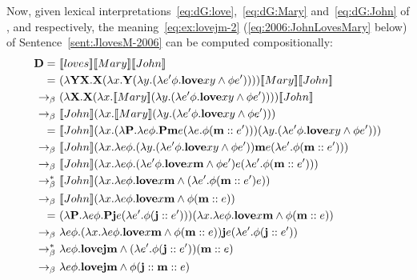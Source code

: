 \begin{example} Now, given lexical interpretations~\eqref{eq:dG:love},~\eqref{eq:dG:Mary} and~\eqref{eq:dG:John} of ,  and  respectively, the meaning~\eqref{eq:ex:lovejm-2} (\eqref{eq:2006:JohnLovesMary} below) of Sentence~\eqref{sent:JlovesM-2006}  can be computed compositionally:
\begin{align}
\D = \ & \I{loves} \I{Mary} \I{John}  \notag \\
= \ & (\lambda \Y2 \X2. \X2( \lambda \x1. \Y2 (\lambda \y1. ( \lambda e' \phi. \textbf{love} \x1 \y1 \land \phi e' ))) )  \I{Mary} \I{John}  \notag \\
\bconv \ & (\lambda  \X2. \X2( \lambda \x1. \I{Mary}  (\lambda \y1. ( \lambda e' \phi. \textbf{love} \x1 \y1 \land \phi e' ))) )  \I{John}  \notag \\
\bconv \ &    \I{John}( \lambda \x1. \I{Mary}  (\lambda \y1. ( \lambda e' \phi. \textbf{love} \x1 \y1 \land \phi e' )))   \notag \\
= \ &    \I{John}( \lambda \x1. (\lambda \P2. \lambda e \phi. \P2 \textbf{m} e (\lambda e. \phi (\upii{\textbf{m}}{e'})))  (\lambda \y1. ( \lambda e' \phi. \textbf{love} \x1 \y1 \land \phi e' )))   \notag \\
\bconv \ &    \I{John}( \lambda \x1.  \lambda e \phi. (\lambda \y1. ( \lambda e' \phi. \textbf{love} \x1 \y1 \land \phi e' )) \textbf{m} e (\lambda e'. \phi (\upii{\textbf{m}}{e'})))   \notag \\
\bconv \ &    \I{John}( \lambda \x1.  \lambda e \phi. ( \lambda e' \phi. \textbf{love} \x1 \textbf{m} \land \phi e' ) e (\lambda e' . \phi (\upii{\textbf{m}}{e'})))   \notag \\
\bred \ &  \I{John}( \lambda \x1.  \lambda e \phi.  \textbf{love} \x1 \textbf{m} \land  (\lambda e' .\phi (\upii{\textbf{m}}{e'}) e))   \notag \\
\bconv \ &  \I{John}( \lambda \x1.  \lambda e \phi.  \textbf{love} \x1 \textbf{m} \land  \phi (\upii{\textbf{m}}{e} ))   \notag \\
= \ &    ( \lambda \P2. \lambda e \phi. \P2 \textbf{j} e (\lambda e' .\phi (\upii{\textbf{j}}{e'})))( \lambda \x1.  \lambda e \phi.  \textbf{love} \x1 \textbf{m} \land  \phi (\upii{\textbf{m}}{e} ))   \notag \\
\bconv \ &    \lambda e \phi. ( \lambda \x1.  \lambda e \phi.  \textbf{love} \x1 \textbf{m} \land  \phi (\upii{\textbf{m}}{e} ))   \textbf{j} e (\lambda e' . \phi (\upii{\textbf{j}}{e'})) \notag \\
\bred \ &    \lambda e \phi.  \textbf{love}  \textbf{j} \textbf{m} \land   (\lambda e' .\phi (\upii{\textbf{j}}{e'})) (\upii{\textbf{m}}{e} )  \notag \\
\bconv \ &    \lambda e \phi.  \textbf{love}  \textbf{j} \textbf{m} \land   \phi (\upii{\textbf{j}}{\upii{\textbf{m}}{e} })   \label{eq:2006:JohnLovesMary} 
\end{align}
\end{example}

